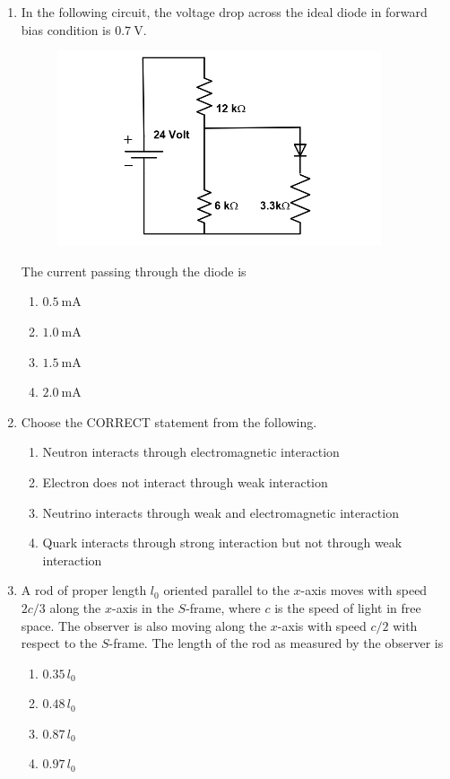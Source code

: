 \documentclass[journal,12pt,onecolumn]{IEEEtran}
\theoremstyle{remark}
\begin{document}
\begin{enumerate}
\item In the following circuit, the voltage drop across the ideal diode in forward bias condition is $0.7\ \mathrm{V}$. 
\begin{figure}[H]
    \centering
    \includegraphics[width = 0.6\columnwidth]{fig/Q33.png}
    \caption*{}
    \label{fig:Q33}
\end{figure}

The current passing through the diode is
\begin{multicols}{4}
\begin{enumerate}
\item $0.5\ \mathrm{mA}$
\item $1.0\ \mathrm{mA}$
\item $1.5\ \mathrm{mA}$
\item $2.0\ \mathrm{mA}$
\end{enumerate}
\end{multicols}

\item Choose the CORRECT statement from the following.
\begin{multicols}{2}
\begin{enumerate}
\item Neutron interacts through electromagnetic interaction
\item Electron does not interact through weak interaction
\item Neutrino interacts through weak and electromagnetic interaction
\item Quark interacts through strong interaction but not through weak interaction
\end{enumerate}
\end{multicols}

\item A rod of proper length $l_{0}$ oriented parallel to the $x$-axis moves with speed $2c/3$ along the $x$-axis in the $S$-frame, where $c$ is the speed of light in free space. The observer is also moving along the $x$-axis with speed $c/2$ with respect to the $S$-frame. The length of the rod as measured by the observer is
\begin{multicols}{4}
\begin{enumerate}
\item $0.35\,l_{0}$
\item $0.48\,l_{0}$
\item $0.87\,l_{0}$
\item $0.97\,l_{0}$
\end{enumerate}
\end{multicols}


\end{enumerate}
\end{document}
